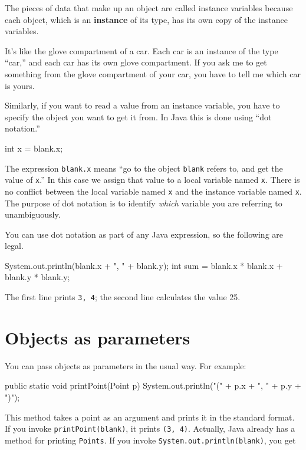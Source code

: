 The pieces of data that make up an object are called instance
variables because each object, which is an {\bf instance} of its
type, has its own copy of the instance variables.

It's like the glove compartment of a car.  Each car is an instance
of the type ``car,'' and each car has its own glove compartment.  If
you ask me to get something from the glove compartment of your car,
you have to tell me which car is yours.


Similarly, if you want to read a value from an instance variable, you
have to specify the object you want to get it from.  In Java this is
done using ``dot notation.''

\begin{code}
    int x = blank.x;
\end{code}

The expression {\tt blank.x} means ``go to the object {\tt blank}
refers to, and get the value of {\tt x}.''  In this case we assign
that value to a local variable named {\tt x}.  There is no
conflict between the local variable named {\tt x} and the instance
variable named {\tt x}.  The purpose of dot notation is to identify
{\em which} variable you are referring to unambiguously.

You can use dot notation as part of any Java expression, so the
following are legal.

\begin{code}
    System.out.println(blank.x + ", " + blank.y);
    int sum = blank.x * blank.x + blank.y * blank.y;
\end{code}

The first line prints {\tt 3, 4}; the second line calculates
the value 25.

\section{Objects as parameters}

You can pass objects as parameters in the usual way.  For
example:

\begin{code}
  public static void printPoint(Point p) {
    System.out.println("(" + p.x + ", " + p.y + ")");
  }
\end{code}

This method takes a point as an argument and prints it in
the standard format.  If you invoke {\tt printPoint(blank)},
it prints {\tt(3, 4)}.  Actually, Java already has a
method for printing {\tt Points}.  If you invoke
{\tt System.out.println(blank)}, you get

